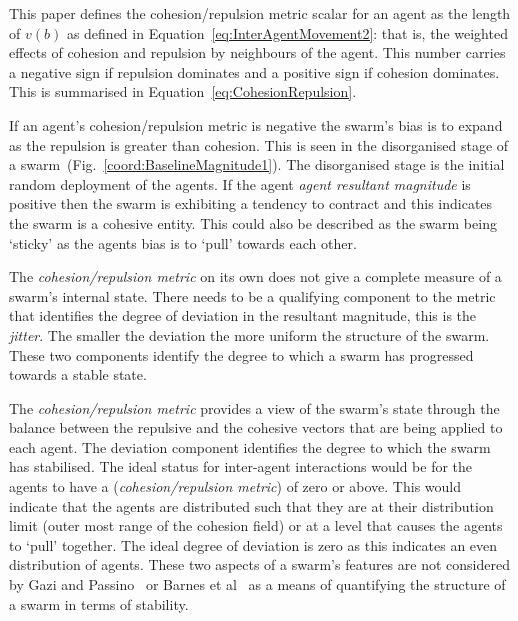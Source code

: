 \documentclass{ieeeaccess}
\begin{document}


This paper defines the cohesion/repulsion metric scalar for an agent as the
length of $v(b)$  as defined in Equation~\ref{eq:InterAgentMovement2}: that is,
the weighted effects of cohesion and repulsion by neighbours of the agent. This
number carries a negative sign if repulsion dominates and a positive sign if
cohesion dominates. This is summarised in Equation~\ref{eq:CohesionRepulsion}.

If an agent's {cohesion/repulsion metric} is negative the swarm's bias is to
expand as the repulsion is greater than cohesion. This is seen in the
disorganised stage of a swarm~(Fig.~\ref{coord:BaselineMagnitude1}). The
disorganised stage is the initial random deployment of the agents. If the agent
\textit{agent resultant magnitude} is positive then the swarm is exhibiting a
tendency to contract and this indicates the swarm is a cohesive entity. This
could also be described as the swarm being `sticky' as the agents bias is to
`pull' towards each other.

The \textit{cohesion/repulsion metric} on its own does not give a complete
measure of a swarm's internal state. There needs to be a qualifying component
to the metric that identifies the degree of deviation in the resultant
magnitude, this is the \textit{jitter}. The smaller the deviation the more
uniform the structure of the swarm. These two components identify the degree to
which a swarm has progressed towards a stable state.
 
The \textit{cohesion/repulsion metric} provides a view of the swarm's state
through the balance between the repulsive and the cohesive vectors that are
being applied to each agent. The deviation component identifies the degree to
which the swarm has stabilised. The ideal status for inter-agent interactions
would be for the agents to have a (\textit{cohesion/repulsion metric}) of zero
or above. This would indicate that the agents are distributed such that they
are at their distribution limit (outer most range of the cohesion field) or at
a level that causes the agents to `pull' together. The ideal degree of
deviation is zero as this indicates an even distribution of agents. These two
aspects of a swarm's features are not considered by Gazi and
Passino~\cite{GP:11} or Barnes et al~\cite{BFV:07} as a means of quantifying
the structure of a swarm in terms of stability.
\end{document}
